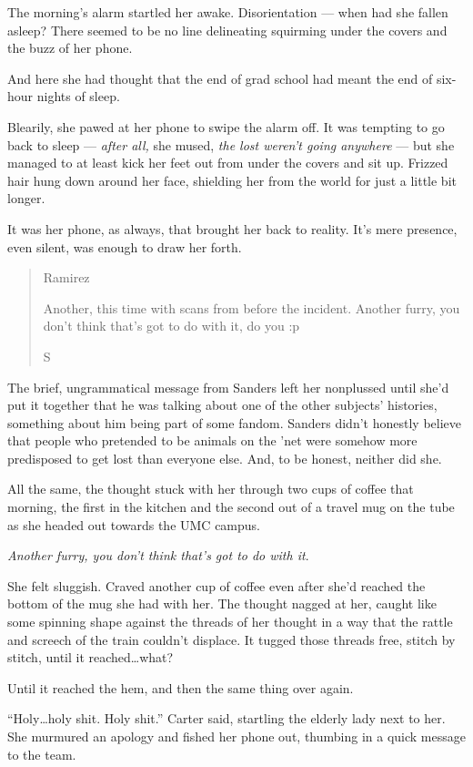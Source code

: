 The morning's alarm startled her awake. Disorientation --- when had she fallen asleep? There seemed to be no line delineating squirming under the covers and the buzz of her phone.

And here she had thought that the end of grad school had meant the end of six-hour nights of sleep.

Blearily, she pawed at her phone to swipe the alarm off. It was tempting to go back to sleep --- \emph{after all,} she mused, \emph{the lost weren't going anywhere} --- but she managed to at least kick her feet out from under the covers and sit up. Frizzed hair hung down around her face, shielding her from the world for just a little bit longer.

It was her phone, as always, that brought her back to reality. It's mere presence, even silent, was enough to draw her forth.

\begin{quote}
Ramirez

Another, this time with scans from before the incident. Another furry, you don't think that's got to do with it, do you :p

S
\end{quote}

The brief, ungrammatical message from Sanders left her nonplussed until she'd put it together that he was talking about one of the other subjects' histories, something about him being part of some fandom. Sanders didn't honestly believe that people who pretended to be animals on the 'net were somehow more predisposed to get lost than everyone else. And, to be honest, neither did she.

All the same, the thought stuck with her through two cups of coffee that morning, the first in the kitchen and the second out of a travel mug on the tube as she headed out towards the UMC campus.

\emph{Another furry, you don't think that's got to do with it}.

She felt sluggish. Craved another cup of coffee even after she'd reached the bottom of the mug she had with her. The thought nagged at her, caught like some spinning shape against the threads of her thought in a way that the rattle and screech of the train couldn't displace. It tugged those threads free, stitch by stitch, until it reached\ldots{}what?

Until it reached the hem, and then the same thing over again.

``Holy\ldots{}holy shit. Holy shit.'' Carter said, startling the elderly lady next to her. She murmured an apology and fished her phone out, thumbing in a quick message to the team.

